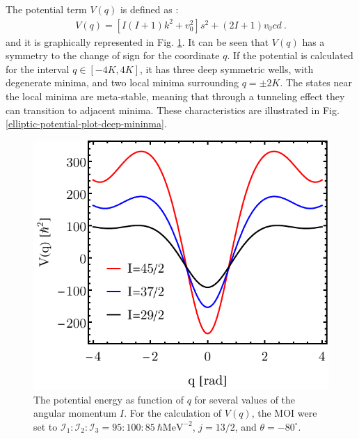 The potential term $V(q)$ is defined as \cite{raduta2020new}:
\begin{align}
    V(q)=\left[I(I+1)k^2+v_0^2\right]s^2+\left(2I+1\right)v_0cd\ .
    \label{elliptic-potential-formula}
\end{align}
and it is graphically represented in Fig. \ref{elliptic-potential-plot}. It can be seen that $V(q)$ has a symmetry to the change of sign for the coordinate $q$. If the potential is calculated for the interval $q\in\left[-4K,4K\right]$, it has three deep symmetric wells, with degenerate minima, and two local minima surrounding $q=\pm 2K$. The states near the local minima are meta-stable, meaning that through a tunneling effect they can transition to adjacent minima. These characteristics are illustrated in Fig. \ref{elliptic-potential-plot-deep-mininma}.
\begin{figure}
    \centering
    \includegraphics[scale=0.8]{Chapters/Figures/Elliptic-Potential-V.pdf}
    \caption{The potential energy as function of $q$ for several values of the angular momentum $I$. For the calculation of $V(q)$, the MOI were set to $\mathcal{I}_1:\mathcal{I}_2:\mathcal{I}_3=95:100:85\ \hbar\text{MeV}^{-2}$, $j=13/2$, and $\theta=-80^\circ$.}
    \label{elliptic-potential-plot}
\end{figure}
